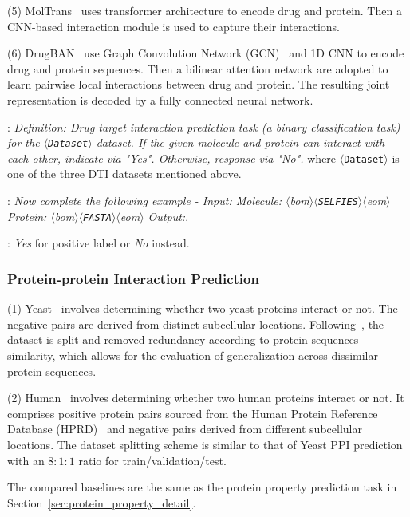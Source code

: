 \documentclass[11pt]{article}
\newcommand{\bom}{$\langle$bom$\rangle$}
\newcommand{\eom}{$\langle$eom$\rangle$}
\newcommand{\bop}{$\langle$bom$\rangle$}
\newcommand{\eop}{$\langle$eom$\rangle$}
\newcommand{\dataset}{$\langle$\texttt{Dataset}$\rangle$}
\newcommand{\selfies}{$\langle$\texttt{SELFIES}$\rangle$}
\newcommand{\fasta}{$\langle$\texttt{FASTA}$\rangle$}
\begin{document}
\noindent(5) MolTrans~\citep{Huang2021MolTransMI} uses transformer architecture to encode drug and protein. Then a CNN-based interaction module is used to capture their interactions.

\noindent(6) DrugBAN~\citep{bai2023interpretable} use Graph Convolution Network (GCN)~\citep{DBLP:conf/iclr/KipfW17} and 1D CNN to encode drug and protein sequences. Then a bilinear attention network are adopted to learn pairwise local interactions between drug and protein. The resulting joint representation is decoded by a fully connected neural network.


:
\textit{Definition: Drug target interaction prediction task (a binary classification task) for the \dataset{} dataset. If the given molecule and protein can interact with each other, indicate via "Yes". Otherwise, response via "No".} where \dataset{} is one of the three DTI datasets mentioned above.

:
\textit{Now complete the following example - Input: Molecule: \bom{}\selfies{}\eom{} Protein: \bop{}\fasta{}\eop{} Output:}.

:
\textit{Yes} for positive label or \textit{No} instead.

\subsubsection{Protein-protein Interaction Prediction}

\noindent(1) Yeast~\citep{guo2008using} involves determining whether two yeast proteins interact or not. The negative pairs are derived from distinct subcellular locations. Following~\citep{xu2022peer}, the dataset is split and removed redundancy according to protein sequences similarity, which allows for the evaluation of generalization across dissimilar protein sequences.

\noindent(2) Human~\citep{pan2010large} involves determining whether two human proteins interact or not. It comprises positive protein pairs sourced from the Human Protein Reference Database (HPRD)~\citep{peri2003development} and negative pairs derived from different subcellular locations. The dataset splitting scheme is similar to that of Yeast PPI prediction with an $8:1:1$ ratio for train/validation/test. 

The compared baselines are the same as the protein property prediction task in Section~\ref{sec:protein_property_detail}.
\end{document}
